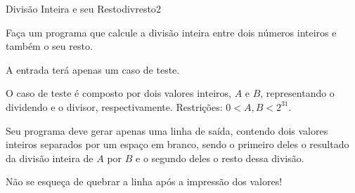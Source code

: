 \documentclass[12pt,a4paper,oneside]{article}
\begin{document}
\begin{problem}{Divisão Inteira e seu Resto}{divresto}{2}
 
Faça um programa que calcule a divisão inteira entre dois números inteiros e também o seu resto.

%

\InputFile

A entrada terá apenas um caso de teste.

O caso de teste é composto por dois valores inteiros, $A$ e $B$, representando o dividendo e o divisor, respectivamente. Restrições: $0 < A,B < 2^{31}$.

\OutputFile

Seu programa deve gerar apenas uma linha de saída, contendo dois valores inteiros separados por um espaço em branco, sendo o primeiro deles o resultado da
divisão inteira de $A$ por $B$ e o segundo deles o resto dessa divisão.

Não se esqueça de quebrar a linha após a impressão dos valores!

\Example

\begin{example}
%
\end{example}

\begin{example}
%
\end{example}

\begin{example}
%
\end{example}



\end{problem}
\end{document}
